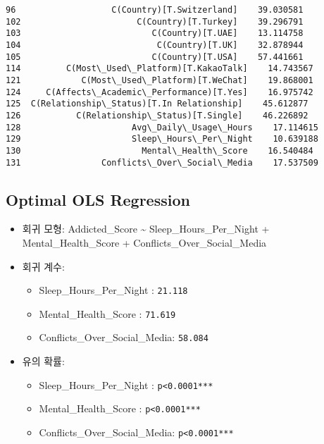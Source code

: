 \documentclass[11pt]{article}
\providecommand{\tightlist}{%
      \setlength{\itemsep}{0pt}\setlength{\parskip}{0pt}}
\begin{document}
\begin{tcolorbox}[breakable, size=fbox, boxrule=.5pt, pad at break*=1mm, opacityfill=0]
\begin{Verbatim}[commandchars=\\\{\}]
96                   C(Country)[T.Switzerland]    39.030581
102                       C(Country)[T.Turkey]    39.296791
103                          C(Country)[T.UAE]    13.114758
104                           C(Country)[T.UK]    32.878944
105                          C(Country)[T.USA]    57.441661
114         C(Most\_Used\_Platform)[T.KakaoTalk]    14.743567
121            C(Most\_Used\_Platform)[T.WeChat]    19.868001
124     C(Affects\_Academic\_Performance)[T.Yes]    16.975742
125  C(Relationship\_Status)[T.In Relationship]    45.612877
126           C(Relationship\_Status)[T.Single]    46.226892
128                      Avg\_Daily\_Usage\_Hours    17.114615
129                      Sleep\_Hours\_Per\_Night    10.639188
130                        Mental\_Health\_Score    16.540484
131                Conflicts\_Over\_Social\_Media    17.537509
\end{Verbatim}
\end{tcolorbox}
        
    \subsection{Optimal OLS Regression}\label{optimal-ols-regression}

\begin{itemize}
\tightlist
\item
  회귀 모형: Addicted\_Score \textasciitilde{} Sleep\_Hours\_Per\_Night
  + Mental\_Health\_Score + Conflicts\_Over\_Social\_Media
\item
  회귀 계수:

  \begin{itemize}
  \tightlist
  \item
    Sleep\_Hours\_Per\_Night : \texttt{21.118}
  \item
    Mental\_Health\_Score : \texttt{71.619}
  \item
    Conflicts\_Over\_Social\_Media: \texttt{58.084}
  \end{itemize}
\item
  유의 확률:

  \begin{itemize}
  \tightlist
  \item
    Sleep\_Hours\_Per\_Night : \texttt{p\textless{}0.0001***}
  \item
    Mental\_Health\_Score : \texttt{p\textless{}0.0001***}
  \item
    Conflicts\_Over\_Social\_Media: \texttt{p\textless{}0.0001***}
  \end{itemize}
\end{itemize}
\end{document}
